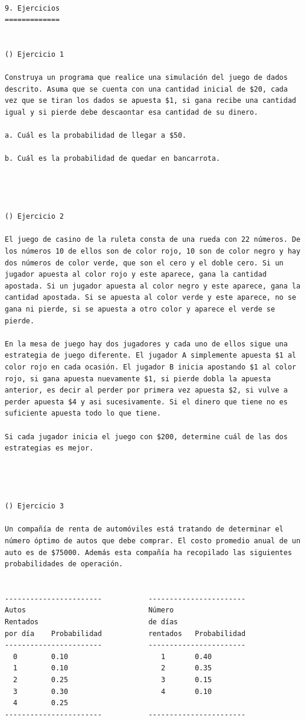 \begin{verbatim}
 
9. Ejercicios
=============


() Ejercicio 1

Construya un programa que realice una simulación del juego de dados descrito. Asuma que se cuenta con una cantidad inicial de $20, cada vez que se tiran los dados se apuesta $1, si gana recibe una cantidad igual y si pierde debe descaontar esa cantidad de su dinero.

a. Cuál es la probabilidad de llegar a $50.

b. Cuál es la probabilidad de quedar en bancarrota.




() Ejercicio 2

El juego de casino de la ruleta consta de una rueda con 22 números. De los números 10 de ellos son de color rojo, 10 son de color negro y hay dos números de color verde, que son el cero y el doble cero. Si un jugador apuesta al color rojo y este aparece, gana la cantidad apostada. Si un jugador apuesta al color negro y este aparece, gana la cantidad apostada. Si se apuesta al color verde y este aparece, no se gana ni pierde, si se apuesta a otro color y aparece el verde se pierde.

En la mesa de juego hay dos jugadores y cada uno de ellos sigue una estrategia de juego diferente. El jugador A simplemente apuesta $1 al color rojo en cada ocasión. El jugador B inicia apostando $1 al color rojo, si gana apuesta nuevamente $1, si pierde dobla la apuesta anterior, es decir al perder por primera vez apuesta $2, si vulve a perder apuesta $4 y asi sucesivamente. Si el dinero que tiene no es suficiente apuesta todo lo que tiene.

Si cada jugador inicia el juego con $200, determine cuál de las dos estrategias es mejor.




() Ejercicio 3

Un compañía de renta de automóviles está tratando de determinar el número óptimo de autos que debe comprar. El costo promedio anual de un auto es de $75000. Además esta compañía ha recopilado las siguientes probabilidades de operación.


-----------------------           -----------------------
Autos                             Número
Rentados                          de días
por día    Probabilidad           rentados   Probabilidad
-----------------------           -----------------------
  0        0.10                      1       0.40
  1        0.10                      2       0.35
  2        0.25                      3       0.15
  3        0.30                      4       0.10
  4        0.25
-----------------------           -----------------------



\end{verbatim}
